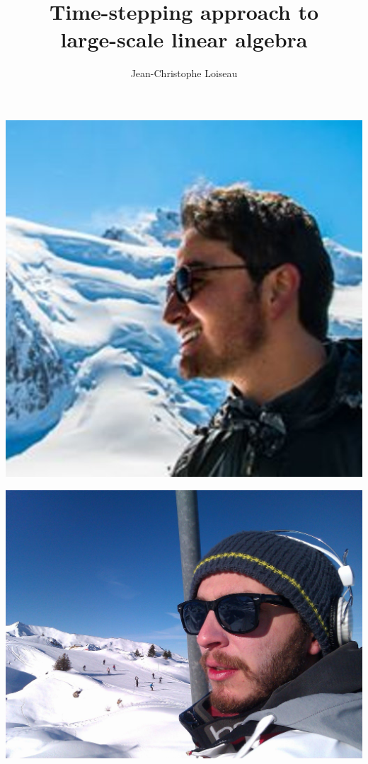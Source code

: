 \documentclass[aspectratio=169, usenames, dvipsnames]{beamer}
\title{Time-stepping approach to \\ large-scale linear algebra}
\author[JC]{Jean-Christophe Loiseau}
\begin{document}
\begin{frame}
  \titlepage
\end{frame}

\begin{frame}
  \vfill
  \begin{minipage}{.32\textwidth}
    \centering
    \includegraphics[height=.42\textheight]{ricardo}
  \end{minipage}%
  \hfill
  \begin{minipage}{.32\textwidth}
    \centering
    \includegraphics[height=.42\textheight]{myself}

\end{minipage}
\end{frame}
\end{document}
